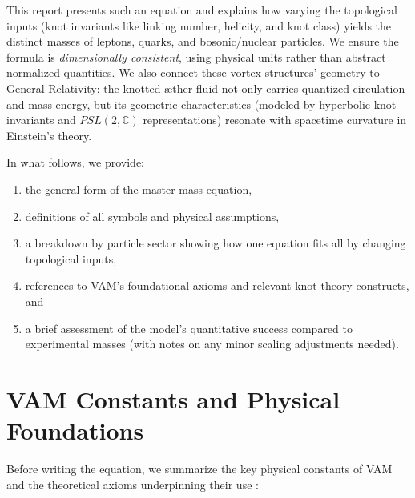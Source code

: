 \documentclass[11pt]{article}
\begin{document}
    This report presents such an equation and explains how varying the topological inputs (knot invariants like linking number, helicity, and knot class) yields the distinct masses of leptons, quarks, and bosonic/nuclear particles. We ensure the formula is \textit{dimensionally consistent}, using physical units rather than abstract normalized quantities. We also connect these vortex structures’ geometry to General Relativity: the knotted æther fluid not only carries quantized circulation and mass-energy, but its geometric characteristics (modeled by hyperbolic knot invariants and $PSL(2,\mathbb{C})$ representations) resonate with spacetime curvature in Einstein’s theory.

    In what follows, we provide:
    \begin{enumerate}
        \item the general form of the master mass equation,
        \item definitions of all symbols and physical assumptions,
        \item a breakdown by particle sector showing how one equation fits all by changing topological inputs,
        \item references to VAM’s foundational axioms and relevant knot theory constructs, and
        \item a brief assessment of the model’s quantitative success compared to experimental masses (with notes on any minor scaling adjustments needed).
    \end{enumerate}

    \bigskip

    \section{VAM Constants and Physical Foundations}

    Before writing the equation, we summarize the key physical constants of VAM and the theoretical axioms underpinning their use \cite{Iskandarani2025a,Iskandarani2025b}:
\end{document}
